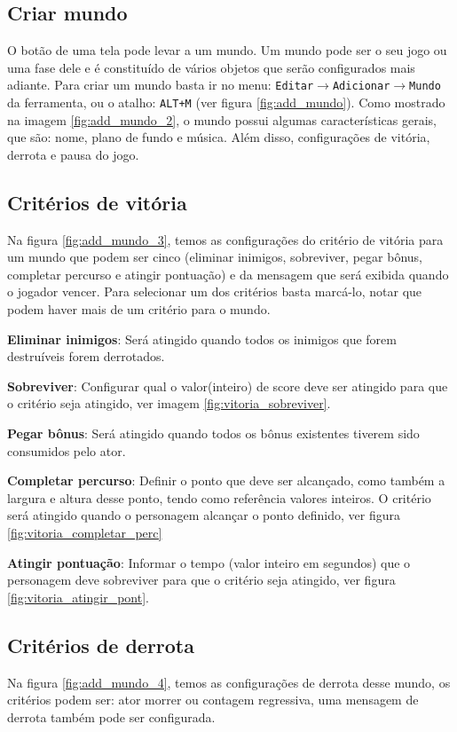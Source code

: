 \documentclass[12pt,oneside,openright,a4paper,english,brazil,sumario=tradicional]{abntex2}
\begin{document}
\begin{anexosenv}
   \section{Criar mundo}
   O botão de uma tela pode levar a um mundo. Um mundo pode ser o seu jogo ou uma fase dele e é constituído de vários objetos que serão configurados mais adiante.
   Para criar um mundo basta ir no menu: \texttt{Editar$\rightarrow$Adicionar$\rightarrow$Mundo} da ferramenta, ou o atalho: \texttt{ALT+M} (ver figura \ref{fig:add_mundo}).
   Como mostrado na imagem \ref{fig:add_mundo_2}, o mundo possui algumas características gerais, que são: nome, plano de fundo e música. Além disso, configurações de vitória, derrota e pausa do jogo.

   \subsection{Critérios de vitória}
   Na figura \ref{fig:add_mundo_3}, temos as configurações do critério de vitória para um mundo que podem ser cinco (eliminar inimigos, sobreviver, pegar bônus, completar percurso e atingir pontuação) e da mensagem que será exibida quando o jogador vencer. Para selecionar um dos critérios basta marcá-lo, notar que podem haver mais de um critério para o mundo.

   \begin{alineas}
   \item \textbf{Eliminar inimigos}: Será atingido quando todos os inimigos que forem destruíveis forem derrotados.
   \item \textbf{Sobreviver}: Configurar qual o valor(inteiro) de score deve ser atingido para que o critério seja atingido, ver imagem \ref{fig:vitoria_sobreviver}.
   \item \textbf{Pegar bônus}: Será atingido quando todos os bônus existentes tiverem sido consumidos pelo ator.
   \item \textbf{Completar percurso}: Definir o ponto que deve ser alcançado, como também a largura e altura desse ponto, tendo como referência valores inteiros. O critério será atingido quando o personagem alcançar o ponto definido, ver figura \ref{fig:vitoria_completar_perc}
   \item \textbf{Atingir pontuação}: Informar o tempo (valor inteiro em segundos) que o personagem deve sobreviver para que o critério seja atingido, ver figura \ref{fig:vitoria_atingir_pont}.
   \end{alineas}

   \subsection{Critérios de derrota}
   Na figura \ref{fig:add_mundo_4}, temos as configurações de derrota desse mundo, os critérios podem ser: ator morrer ou contagem regressiva, uma mensagem de derrota também pode ser configurada.


\end{anexosenv}
\end{document}
